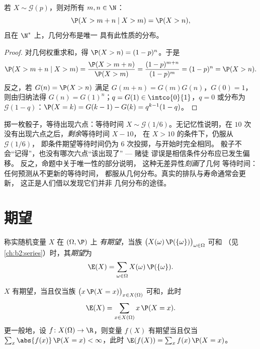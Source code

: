\begin{proposition}[几何
分布的无记忆性]\label{prop:b2:randomvar:memoryless}
若 $X \sim \mathcal{G}(p)$，则对所有 $m, n \in \N$：
\[
\P(X > m + n \mid X > m) = \P(X > n) ,
\]
且在 $\N^*$ 上，几何分布是唯一
具有此性质的分布。
\end{proposition}

\begin{proof}
对几何权重求和，得 $\P(X > n) = (1-p)^n$。于是
\[
\P(X > m + n \mid X > m)
= \frac{\P(X > m + n)}{\P(X > m)}
= \frac{(1-p)^{m+n}}{(1-p)^m} = (1-p)^n = \P(X > n).
\]
反之，若 $G(n) = \P(X > n)$ 满足 $G(m + n) =
G(m)G(n)$，$G(0) = 1$，则由归纳法得 $G(n) = G(1)^n$；$q =
G(1) \in \intco{0}{1}$，$q = 0$ 或分布为
$\mathcal{G}(1 - q)$：$\P(X = k) = G(k-1) - G(k) =
q^{k-1}(1 - q)$。
\end{proof}

\begin{example}
掷一枚骰子，等待出现六点：等待时间 $X \sim
\mathcal G(1/6)$。无记忆性说明，在 $10$ 次
没有出现六点之后，\emph{剩余}等待时间 $X - 10$，
在 $X > 10$ 的条件下，仍服从 $\mathcal G(1/6)$，
即条件期望等待时间仍为 $6$ 次投掷，与开始时完全相同。
骰子不会“记得”，也没有哪次六点“该出现了” --- 赌徒
谬误是相信条件分布应已发生偏移。
反之，命题中关于唯一性的部分说明，
这种无差异性\emph{刻画}了几何
等待时间：任何预测从不更新的等待时间，
都服从几何分布。真实的排队与寿命通常会更新，
这正是人们借以发现它们并非
几何分布的途径。
\end{example}

\section{期望}

\begin{definition}[期望]\label{def:b2:randomvar:expectation}
称实随机变量 $X$ 在 $(\Omega, \P)$ 上
\emph{有期望}，当族
$\bigl(X(\omega)\,\P(\{\omega\})\bigr)_{\omega \in \Omega}$ 可和
（见\cref{ch:b2:series}）时，其\emph{期望}为
\[
\E(X) = \sum_{\omega \in \Omega} X(\omega)\,\P(\{\omega\}) .
\]
\end{definition}

\begin{theorem}[转移定理]\label{thm:b2:randomvar:transfer}
$X$ 有期望，当且仅当族 $\bigl(x\,\P(X =
x)\bigr)_{x \in X(\Omega)}$ 可和，此时
\[
\E(X) = \sum_{x \in X(\Omega)} x\,\P(X = x) .
\]
更一般地，设 $f \colon X(\Omega) \to \R$，则变量
$f(X)$ 有期望当且仅当 $\sum_x \abs{f(x)}\,\P(X = x) <
\infty$，此时 $\E(f(X)) = \sum_x f(x)\,\P(X = x)$。
\end{theorem}

